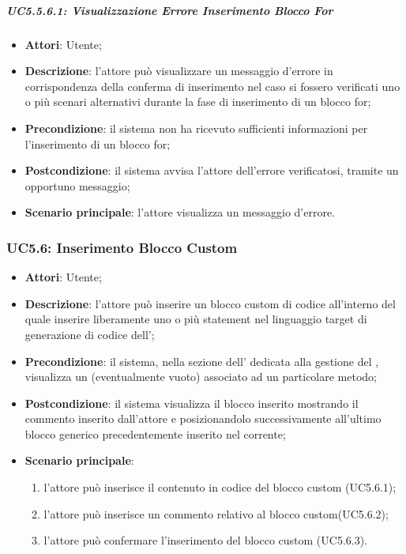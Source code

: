 \subparagraph{UC5.5.6.1: Visualizzazione Errore Inserimento Blocco For}
\label{UC5.5.6.1}
\begin{itemize}
	\item \textbf{Attori}: Utente;
	\item \textbf{Descrizione}: l'attore può visualizzare un messaggio d'errore in corrispondenza della conferma di inserimento nel caso si fossero verificati uno o più scenari alternativi durante la fase di inserimento di un blocco for;
	\item \textbf{Precondizione}: il sistema non ha ricevuto sufficienti informazioni per l'inserimento di un blocco for;
	\item \textbf{Postcondizione}: il sistema avvisa l'attore dell'errore verificatosi, tramite un opportuno messaggio;
	\item \textbf{Scenario principale}: l'attore visualizza un messaggio d'errore.
\end{itemize}

\subsubsection{UC5.6: Inserimento Blocco Custom}
\label{UC5.6}
\begin{itemize}
	\item \textbf{Attori}: Utente;
	\item \textbf{Descrizione}: l'attore può inserire un blocco custom di codice all'interno del quale inserire liberamente uno o più statement nel linguaggio target di generazione di codice dell';
	\item \textbf{Precondizione}: il sistema, nella sezione dell' dedicata alla gestione del , visualizza un  (eventualmente vuoto) associato ad un particolare metodo;
	\item \textbf{Postcondizione}: il sistema visualizza il blocco inserito mostrando il commento inserito dall'attore e posizionandolo successivamente all'ultimo blocco generico precedentemente
	inserito nel  corrente;
	\item \textbf{Scenario principale}:
	\begin{enumerate}
		\item l'attore può inserisce il contenuto in codice del blocco custom (UC5.6.1);
		\item l'attore può inserisce un commento relativo al blocco custom(UC5.6.2);
		\item l'attore può confermare l'inserimento del blocco custom (UC5.6.3).
	\end{enumerate}
\end{itemize}

